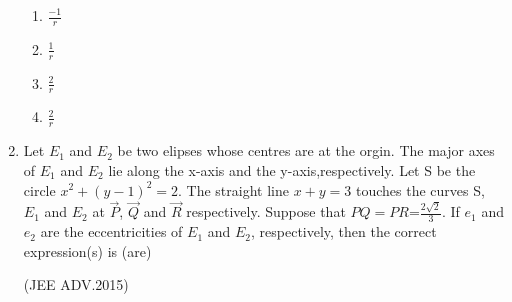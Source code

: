 \begin{enumerate}
		 \begin{enumerate}
			\item$\frac{-1}{r}$
			\item$\frac{1}{r}$
			\item$\frac{2}{r}$
			\item$\frac{2}{r}$
	        \end{enumerate}
	\item Let $ E_1$  and $ E_2$ be two elipses whose centres are at the orgin.
              The major axes of $E_1$ and $ E_2$ lie along the x-axis and the
              y-axis,respectively. Let S be the circle $x^2+(y-1)^2=2$. The
		straight line $x+y=3$ touches the curves S, $E_1$ and $E_2$ at $\vec{P}$, $\vec{Q}$
		and $\vec{R}$ respectively. Suppose that $PQ=PR$=$\frac{2\sqrt{2}}{3}$. If $e_1$ and
              $e_2$ are the eccentricities of $E_1$ and $E_2$, respectively, then the 
              correct expression(s) is (are) 
	        
		\hfill(JEE ADV.2015)
		

\end{enumerate}
